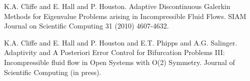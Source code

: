 
\begin{thebibliography}{10}

{\sc K.A. Cliffe and E. Hall and P. Houston}. {Adaptive Discontinuous Galerkin Methods for Eigenvalue Problems arising in Incompressible Fluid Flows}. SIAM Journal on Scientific Computing 31 (2010) 4607-4632.



{\sc K.A. Cliffe and E. Hall and P. Houston and E.T. Phipps and A.G. Salinger}. {Adaptivity and A Posteriori Error Control for Bifurcation Problems III: Incompressible fluid flow in Open Systems with O(2) Symmetry}. Journal of Scientific Computing (in press).

\end{thebibliography}
